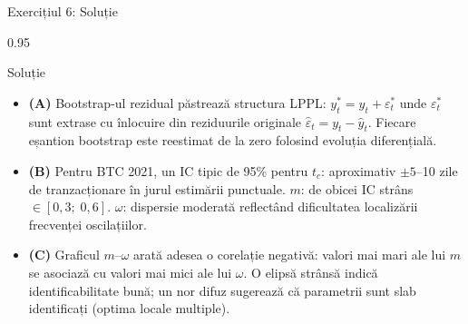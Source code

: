 \documentclass[9pt, aspectratio=169, t]{beamer}
\begin{document}
\begin{frame}{Exercițiul 6: Soluție}
    \begin{cminipage}{0.95\textwidth}
    \begin{exampleblock}{Soluție}
        {\small
        \begin{itemize}\setlength{\itemsep}{3pt}
            \item \textcolor{MainBlue}{\textbf{(A)}} Bootstrap-ul rezidual păstrează structura LPPL: $y^*_t = \hat{y}_t + \varepsilon^*_t$ unde $\varepsilon^*_t$ sunt extrase cu înlocuire din reziduurile originale $\hat{\varepsilon}_t = y_t - \hat{y}_t$. Fiecare eșantion bootstrap este reestimat de la zero folosind evoluția diferențială.
            \item \textcolor{MainBlue}{\textbf{(B)}} Pentru BTC 2021, un IC tipic de 95\% pentru $t_c$: aproximativ $\pm 5$--10 zile de tranzacționare în jurul estimării punctuale. $m$: de obicei IC strâns $\in [0{,}3;\; 0{,}6]$. $\omega$: dispersie moderată reflectând dificultatea localizării frecvenței oscilațiilor.
            \item \textcolor{MainBlue}{\textbf{(C)}} Graficul $m$--$\omega$ arată adesea o corelație negativă: valori mai mari ale lui $m$ se asociază cu valori mai mici ale lui $\omega$. O elipsă strânsă indică identificabilitate bună; un nor difuz sugerează că parametrii sunt slab identificați (optima locale multiple).
        \end{itemize}
        }
    \end{exampleblock}
    \end{cminipage}
\end{frame}
\end{document}
